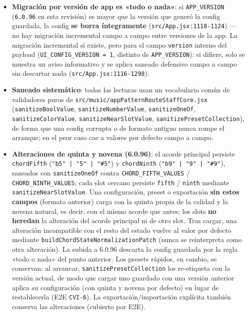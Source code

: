 \documentclass[a4paper,11pt,oneside]{report}
\begin{document}
\begin{itemize}
\item \textbf{Migración por versión de app es «todo o nada»}: si \lstinline!APP_VERSION! (\lstinline!6.0.96! en esta revisión) es mayor que la versión que generó la config guardada, la config \textbf{se borra íntegramente} (\lstinline!src/App.jsx:1118-1124!) --- no hay migración incremental campo a campo entre versiones de la app. La migración incremental sí existe, pero para el campo \lstinline!version! interno del payload (\lstinline!UI_CONFIG_VERSION = 1!, distinto de \lstinline!APP_VERSION!): si difiere, solo se muestra un aviso informativo y se aplica saneado defensivo campo a campo sin descartar nada (\lstinline!src/App.jsx:1116-1298!).
\item \textbf{Saneado sistemático}: todas las lecturas usan un vocabulario común de validadores puros de \lstinline!src/music/appPatternRouteStaffCore.jsx! (\lstinline!sanitizeBoolValue!, \lstinline!sanitizeNumberValue!, \lstinline!sanitizeOneOf!, \lstinline!sanitizeColorValue!, \lstinline!sanitizeNearSlotValue!, \lstinline!sanitizePresetCollection!), de forma que una config corrupta o de formato antiguo nunca rompe el arranque; en el peor caso cae a valores por defecto campo a campo.
\item \textbf{Alteraciones de quinta y novena (6.0.96)}: el acorde principal persiste \lstinline!chordFifth! (\lstinline!"b5" | "5" | "#5"!) y \lstinline!chordNinth! (\lstinline!"b9" | "9" | "#9"!), saneados con \lstinline!sanitizeOneOf! contra \lstinline!CHORD_FIFTH_VALUES! / \lstinline!CHORD_NINTH_VALUES!; cada slot cercano persiste \lstinline!fifth! / \lstinline!ninth! mediante \lstinline!sanitizeNearSlotValue!. Una configuración, preset o exportación \textbf{sin estos campos} (formato anterior) carga con la quinta propia de la calidad y la novena natural, es decir, con el mismo acorde que antes; los slots \textbf{no heredan} la alteración del acorde principal ni de otro slot. Tras cargar, una alteración incompatible con el resto del estado vuelve al valor por defecto mediante \lstinline!buildChordStateNormalizationPatch! (nunca se reinterpreta como otra alteración). La subida a 6.0.96 descarta la config guardada por la regla «todo o nada» del punto anterior. Los presets rápidos, en cambio, se conservan: al arrancar, \lstinline!sanitizePresetCollection! los re-etiqueta con la versión actual, de modo que cargar uno guardado con una versión anterior aplica su configuración (con quinta y novena por defecto) en lugar de restablecerla (E2E \lstinline!CVI-6!). La exportación/importación explícita también conserva las alteraciones (cubierto por E2E).

\end{itemize}
\end{document}
